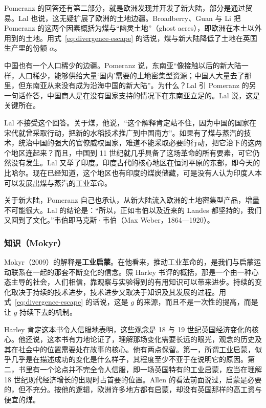 Pomeranz 的回答还有第二部分，就是欧洲发现并开发了新大陆，部分是通过贸易\cite{lal2000}。Lal 也说，这无疑扩展了欧洲的土地边疆\cite{lal2000}。Broadberry、Guan 与 Li 把 Pomeranz 的这两个因素概括为煤与“幽灵土地”（ghost acres），即欧洲在本土以外用到的土地\cite{bgl2017}。用式~\eqref{eq:divergence-escape} 的话说，煤与新大陆降低了土地在英国生产里的份额 $\alpha$。

中国也有一个人口稀少的边疆。Pomeranz 说，东南亚“像接触以后的新大陆一样，人口稀少，能够供给大量‘国内’需要的土地密集型资源；中国人大量去了那里，但东南亚从来没有成为沿海中国的新大陆”\cite{lal2000}。为什么？Lal 引 Pomeranz 的另一句话作答，中国商人是在没有国家支持的情况下在东南亚立足的。Lal 说，这是关键所在\cite{lal2000}。

Lal 不接受这个回答。关于煤，他说，“这个解释肯定站不住，因为中国的国家在宋代就曾采取行动，把新的水稻技术推广到中国南方”。如果有了煤与蒸汽的技术，统治中国的强大的官僚威权国家，难道不能采取必要的行动，把它治下的这两个地区连起来？而且，中国到 11 世纪就几乎具备了这场革命的所有要素，可它仍然没有发生\cite{lal2000}。Lal 又举了印度。印度古代的核心地区在恒河平原的东部，即今天的比哈尔。现在已经知道，这个地区也有印度的煤炭储藏，可是没有人认为印度人本可以发展出煤与蒸汽的工业革命\cite{lal2000}。

关于新大陆，Pomeranz 自己也承认，从新大陆流入欧洲的土地密集型产品，增量不可能很大\cite{lal2000}。Lal 的结论是：“所以，正如韦伯以及近来的 Landes 都坚持的，我们又回到了文化。”\cite{lal2000}韦伯即马克斯·韦伯（Max Weber，1864—1920）。

\subsubsection{知识（Mokyr）}
Mokyr（2009）的解释是\textbf{工业启蒙}。在他看来，推动工业革命的，是我们与启蒙运动联系在一起的那套不断变化的信念\cite{mokyr2009,harley2010}。照 Harley 书评的概括，那是一个由一种心态主导的社会，人们相信，靠观察与实验得到的有用知识可以带来进步。持续的变化取决于持续的技术进步，技术进步又取决于知识及其发展的过程\cite{harley2010}。用式~\eqref{eq:divergence-escape} 的话说，这是 $g$ 的来源，而且不是一次性的提高，而是让 $g$ 持续下去的机制。

Harley 肯定这本书令人信服地表明，这些观念是 18 与 19 世纪英国经济变化的核心。他还说，这本书有力地论证了，理解那场变化需要长远的眼光，观念的历史及其在社会中的位置需要处在故事的核心\cite{harley2010}。他有两点保留。第一，所谓工业启蒙，似乎几乎是在描述成功的变化是什么样子，其程度至少不亚于在说明它的原因。第二，书里有一个论点并不完全令人信服，即一场英国特有的工业启蒙，应当在理解 18 世纪现代经济增长的出现时占首要的位置\cite{harley2010}。Allen 的看法前面说过，启蒙是必要的，但不充分。按他的逻辑，欧洲许多地方都有启蒙，却没有英国那样的高工资与便宜的煤\cite{leunig2011}。


